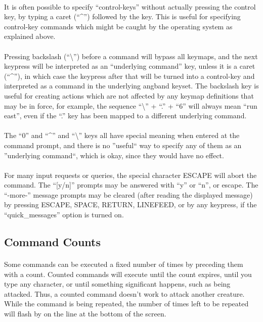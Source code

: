 \paragraph{}It is often possible to specify ``control-keys'' without actually
pressing the control key, by typing a caret (``\^{}'') followed by the key.
This is useful for specifying control-key commands which might be caught
by the operating system as explained above.

\paragraph{}Pressing backslash (``\textbackslash '') before a command will bypass all keymaps,
and the next keypress will be interpreted as an ``underlying command'' key,
unless it is a caret (``\^{}''), in which case the keypress after that will be
turned into a control-key and interpreted as a command in the underlying
angband keyset. The backslash key is useful for creating actions
which are not affected by any keymap definitions that may be in force, for
example, the sequence ``\textbackslash '' + ``.'' + ``6'' will always mean ``run east'', even if
the ``.'' key has been mapped to a different underlying command.

\paragraph{}The ``0'' and ``\^{}'' and ``\textbackslash '' keys all have special meaning when entered
at the command prompt, and there is no ''useful`` way to specify any of them
as an ''underlying command``, which is okay, since they would have no effect.

\paragraph{}For many input requests or queries, the special character ESCAPE
will abort the command. The ``[y/n]'' prompts may be answered with ``y'' or
``n'', or escape. The ``-more-'' message prompts may be cleared (after reading
the displayed message) by pressing ESCAPE, SPACE, RETURN, LINEFEED, or by
any keypress, if the ``quick\_messages'' option is turned on.
 

\subsection{Command Counts}
 
\paragraph{}Some commands can be executed a fixed number of times by preceding
them with a count. Counted commands will execute until the count expires,
until you type any character, or until something significant happens, such
as being attacked. Thus, a counted command doesn't work to attack another
creature. While the command is being repeated, the number of times left
to be repeated will flash by on the line at the bottom of the screen.

